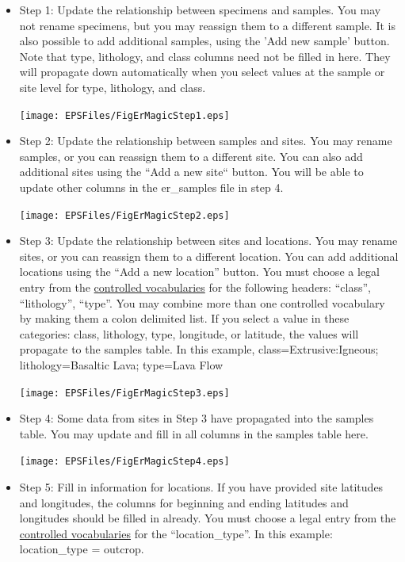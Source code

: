 \documentclass[11pt]{book}
\begin{document}
{\begin{itemize}
 \item Step 1: Update the relationship between specimens and samples.  You may not rename specimens, but you may reassign them to a different sample.  It is also possible to add additional samples, using the 'Add new sample' button.  Note that type, lithology, and class columns need not be filled in here.  They will propagate down automatically when you select values at the sample or site level for type, lithology, and class.

 \texttt{[image: EPSFiles/FigErMagicStep1.eps]}

\item Step 2:  Update the relationship between samples and sites.  You may rename samples, or you can reassign them to a different site.  You can also add additional sites using the ``Add a new site`` button.  You will be able to update other columns in the er\_samples file in step 4.

 \texttt{[image: EPSFiles/FigErMagicStep2.eps]}

\item Step 3: Update the relationship between sites and locations.  You may rename sites, or you can reassign them to a different location.  You can add additional locations using the ``Add a new location'' button.  You must choose a legal entry from the \href{http://earthref.org/MAGIC/shortlists.htm}{controlled vocabularies} for the following headers: ``class'', ``lithology'', ``type''. You may combine more than one controlled vocabulary by making them a colon delimited list.  If you select a value in these categories: class, lithology, type, longitude, or latitude, the values will propagate to the samples table.  In this example,  class=Extrusive:Igneous; lithology=Basaltic Lava; type=Lava Flow

\texttt{[image: EPSFiles/FigErMagicStep3.eps]}

\item Step 4: Some data from sites in Step 3 have propagated into the samples table.  You may update and fill in all columns in the samples table here.

\texttt{[image: EPSFiles/FigErMagicStep4.eps]}

\item Step 5: Fill in information for locations.  If you have provided site latitudes and longitudes, the columns for beginning and ending latitudes and longitudes should be filled in already. You must choose a legal entry from the \href{http://earthref.org/MAGIC/shortlists.htm}{controlled vocabularies} for the  ``location\_type''. In this example: location\_type = outcrop.


\end{itemize}}
\end{document}
